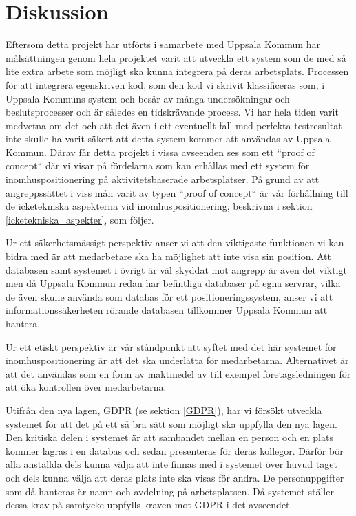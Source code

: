 \documentclass[a4paper,12pt]{article}
\begin{document}
\section{Diskussion}
Eftersom detta projekt har utförts i samarbete med Uppsala Kommun har målsättningen genom hela projektet varit att utveckla ett system som de med så lite extra arbete som möjligt ska kunna integrera på deras arbetsplats. Processen för att integrera egenskriven kod, som den kod vi skrivit klassificeras som, i Uppsala Kommuns system och besår av många undersökningar och beslutsprocesser och är således en tidskrävande process. Vi har hela tiden varit medvetna om det och att det även i ett eventuellt fall med perfekta testresultat inte skulle ha varit säkert att detta system kommer att användas av Uppsala Kommun. Därav får detta projekt i vissa avseenden ses som ett ``proof of concept`` där vi visar på fördelarna som kan erhållas med ett system för inomhuspositionering på aktivitetsbaserade arbetsplatser. På grund av att angreppssättet i viss mån varit av typen ``proof of concept`` är vår förhållning till de icketekniska aspekterna vid inomhuspositionering, beskrivna i sektion \ref{icketekniska_aspekter}, som följer.

Ur ett säkerhetsmässigt perspektiv anser vi att den viktigaste funktionen vi kan bidra med är att medarbetare ska ha möjlighet att inte visa sin position. Att databasen samt systemet i övrigt är väl skyddat mot angrepp är även det viktigt men då Uppsala Kommun redan har befintliga databaser på egna servrar, vilka de även skulle använda som databas för ett positioneringssystem, anser vi att informationssäkerheten rörande databasen tillkommer Uppsala Kommun att hantera.

Ur ett etiskt perspektiv är vår ståndpunkt att syftet med det här systemet för inomhuspositionering är att det ska underlätta för medarbetarna. Alternativet är att det användas som en form av maktmedel av till exempel företagsledningen för att öka kontrollen över medarbetarna.

Utifrån den nya lagen, GDPR (se sektion \ref{GDPR}), har vi försökt utveckla systemet för att det på ett så bra sätt som möjligt ska uppfylla den nya lagen.  Den kritiska delen i systemet är att sambandet mellan en person och en plats kommer lagras i en databas och sedan presenteras för deras kollegor. Därför bör alla anställda dels kunna välja att inte finnas med i systemet över huvud taget och dels kunna välja att deras plats inte ska visas för andra. De personuppgifter som då hanteras är namn och avdelning på arbetsplatsen. Då systemet ställer dessa krav på samtycke uppfylls kraven mot GDPR i det avseendet.
\end{document}
